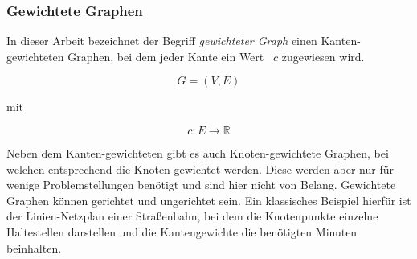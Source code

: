\subsubsection{Gewichtete Graphen}
In dieser Arbeit bezeichnet der Begriff \textit{gewichteter Graph} einen Kanten-gewichteten Graphen, bei dem jeder Kante ein Wert ~$c$ zugewiesen wird.

$$G = (V,E)$$ 
\begin{center}
mit
\end{center}
$$c: E \rightarrow \mathbb{R}$$

Neben dem Kanten-gewichteten gibt es auch Knoten-gewichtete Graphen, bei welchen entsprechend die Knoten gewichtet werden.
Diese werden aber nur für wenige Problemstellungen benötigt und sind hier nicht von Belang.
Gewichtete Graphen können gerichtet und ungerichtet sein.
Ein klassisches Beispiel hierfür ist der Linien-Netzplan einer Straßenbahn, bei dem die Knotenpunkte einzelne Haltestellen darstellen und die Kantengewichte die benötigten Minuten beinhalten.

